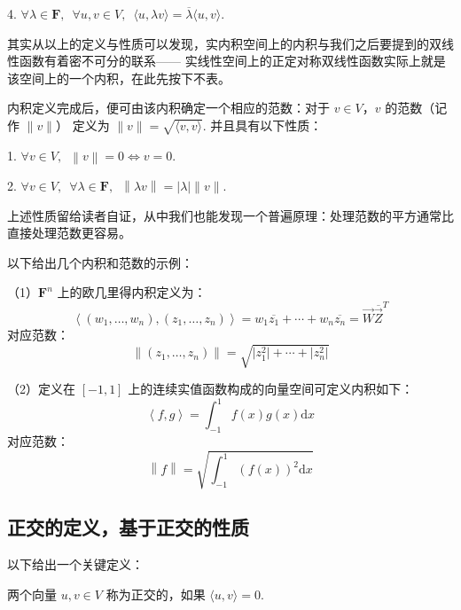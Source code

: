 4. $\forall \lambda \in \mathbf{F}, \enspace \forall u, v \in V, \enspace \langle u, \lambda v \rangle = \overline{\lambda} \langle u, v \rangle$.

其实从以上的定义与性质可以发现，实内积空间上的内积与我们之后要提到的双线性函数有着密不可分的联系——
实线性空间上的正定对称双线性函数实际上就是该空间上的一个内积，在此先按下不表。

\vspace{2ex} 

内积定义完成后，便可由该内积确定一个相应的范数：对于 $v \in V$，$v$ 的范数（记作 $ \lVert v \rVert $）
定义为 $ \lVert v \rVert = \sqrt{\langle v, v \rangle}$. \enspace 并且具有以下性质：

1. $\forall v \in V, \enspace \left\lVert v \right\rVert = 0 \Leftrightarrow v = 0$.

2. $\forall v \in V, \enspace \forall \lambda \in \mathbf{F}, 
\enspace \left\lVert \lambda v \right\rVert  = \left\lvert \lambda \right\rvert \lVert v \rVert$.

上述性质留给读者自证，从中我们也能发现一个普遍原理：处理范数的平方通常比直接处理范数更容易。

\vspace{2ex} 

以下给出几个内积和范数的示例：

\begin{example}
    \textup{（1）}$\mathbf{F}^{n}$ 上的欧几里得内积定义为：
    \[\left\langle (w_1, \ldots, w_n), (z_1, \ldots, z_n)\right\rangle = w_1\overline{z_1} + \cdots + w_n\overline{z_n} = \vec{W}\overline{\vec{Z}}^{T}\]
    对应范数：
    \[\left\lVert (z_1, \ldots, z_n) \right\rVert  = \sqrt{\lvert z^2_1 \rvert + \cdots + \lvert z^2_n \rvert}\]

    \textup{（2）}定义在 $ \left[-1, 1\right] $ 上的连续实值函数构成的向量空间可定义内积如下：
    \[\left\langle f, g\right\rangle = \int_{-1}^1f(x)g(x)\mathrm{d}x\]
    对应范数：
    \[\left\lVert f \right\rVert = \sqrt{\int_{-1}^1(f(x))^2\mathrm{d}x}\]
\end{example}

\subsection{正交的定义，基于正交的性质}

以下给出一个关键定义：

\begin{definition}
    两个向量 $u, v \in V$ 称为正交的，如果 $\langle u, v\rangle = 0$.
\end{definition}

